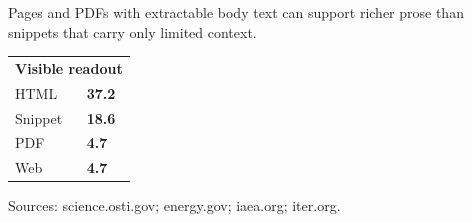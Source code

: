 \documentclass[10pt,a4paper]{article}
\begin{document}
\vspace{1pt}\noindent\begin{minipage}[t]{0.56\linewidth}
{\footnotesize\color{BOText} Pages and PDFs with extractable body text can support richer prose than snippets that carry only limited context.}\par
\end{minipage}\hfill\begin{minipage}[t]{0.36\linewidth}
{\scriptsize\color{BOText}\begin{tabular}{p{31mm}>{\raggedleft\arraybackslash}p{18mm}}
\multicolumn{2}{l}{\textcolor{BOGreen}{\bfseries Visible readout}}\\[2pt]
HTML & \textbf{37.2}\\[1pt]
Snippet & \textbf{18.6}\\[1pt]
PDF & \textbf{4.7}\\[1pt]
Web & \textbf{4.7}\\[1pt]
\end{tabular}}\par
\end{minipage}\par\vspace{1pt}
\par
{\scriptsize\color{BOMuted} Sources: science.osti.gov; energy.gov; iaea.org; iter.org.}\par
\end{document}
